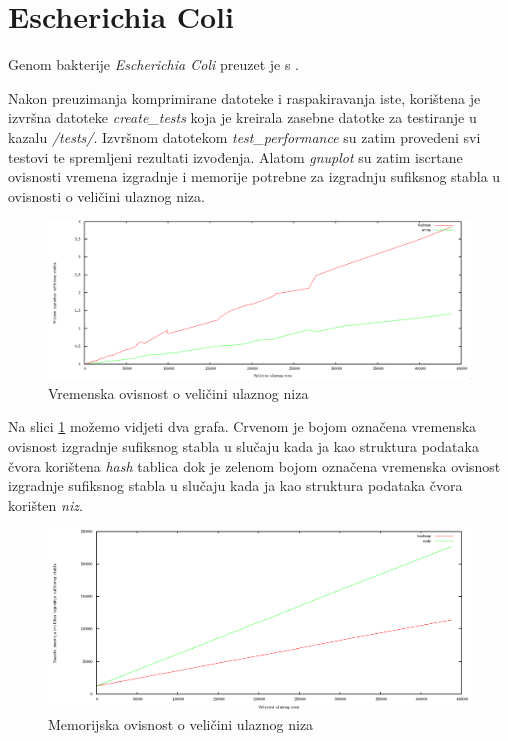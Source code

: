 \documentclass[times, utf8, seminar, numeric]{fer}
\begin{document}
\section{Escherichia Coli}
	Genom bakterije \textit{Escherichia Coli} preuzet je s \cite{ecoli}. 
	
	Nakon preuzimanja komprimirane datoteke i raspakiravanja iste, korištena je izvršna datoteke \textit{create\_tests} koja je kreirala zasebne datotke za testiranje u kazalu \textit{/tests/}. Izvršnom datotekom \textit{test\_performance} su zatim provedeni svi testovi te spremljeni rezultati izvođenja. Alatom \textit{gnuplot} su zatim iscrtane ovisnosti vremena izgradnje i memorije potrebne za izgradnju sufiksnog stabla u ovisnosti o veličini ulaznog niza.

\begin{figure}[h!]	
	\centering
	\includegraphics[width=1\textwidth]{media/time_1.png}
	\caption{Vremenska ovisnost o veličini ulaznog niza}
	\label{image:time1}
\end{figure}

Na slici \ref{image:time1} možemo vidjeti dva grafa. Crvenom je bojom označena vremenska ovisnost izgradnje sufiksnog stabla u slučaju kada ja kao struktura podataka čvora korištena \textit{hash} tablica dok je zelenom bojom označena vremenska ovisnost izgradnje sufiksnog stabla u slučaju kada ja kao struktura podataka čvora korišten \textit{niz}.

\pagebreak %
\begin{figure}[h!]	
	\centering
	\includegraphics[width=1\textwidth]{media/memory_1.png}
	\caption{Memorijska ovisnost o veličini ulaznog niza}
	\label{image:memory1}
\end{figure}
\end{document}
